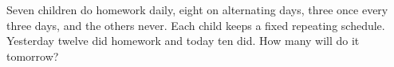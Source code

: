 Seven children do homework daily, eight on alternating days, three once every three days, and the others never. Each child keeps a fixed repeating schedule. Yesterday twelve did homework and today ten did. How many will do it tomorrow?
